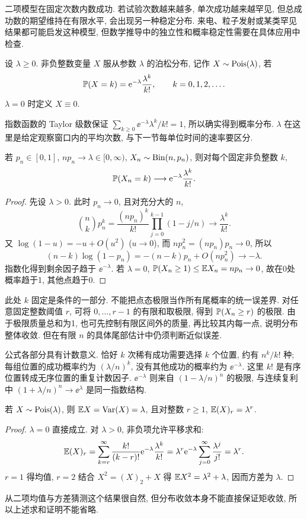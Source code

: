 
二项模型在固定次数内数成功. 若试验次数越来越多, 单次成功越来越罕见, 但总成功数的期望维持在有限水平, 会出现另一种稳定分布. 来电、粒子发射或某类罕见结果都可能启发这种模型, 但数学推导中的独立性和概率稳定性需要在具体应用中检查.
\begin{definition}
设 $\lambda\ge0$. 非负整数变量 $X$ 服从参数 $\lambda$ 的泊松分布, 记作 $X\sim\operatorname{Pois}(\lambda)$, 若
\[
\mathbb P(X=k)=\mathrm e^{-\lambda}\frac{\lambda^k}{k!},\qquad k=0,1,2,\ldots.
\]
$\lambda=0$ 时定义 $X\equiv0$.
\end{definition}
指数函数的 Taylor 级数保证 $\sum_{k\ge0}\ee^{-\lambda}\lambda^k/k!=1$, 所以确实得到概率分布. $\lambda$ 在这里是给定观察窗口内的平均次数, 与下一节每单位时间的速率要区分.

\begin{theorem}[二项分布的泊松极限]
若 $p_n\in[0,1]$, $np_n\to\lambda\in[0,\infty)$, $X_n\sim\operatorname{Bin}(n,p_n)$, 则对每个固定非负整数 $k$,
\[
\mathbb P(X_n=k)\longrightarrow\mathrm e^{-\lambda}\frac{\lambda^k}{k!}.
\]
\end{theorem}
\begin{proof}
先设 $\lambda>0$. 此时 $p_n\to0$, 且对充分大的 $n$,
\[
\binom nkp_n^k=\frac{(np_n)^k}{k!}\prod_{j=0}^{k-1}(1-j/n)\longrightarrow\frac{\lambda^k}{k!}.
\]
又 $\log(1-u)=-u+O(u^2)$ ($u\to0$), 而 $np_n^2=(np_n)p_n\to0$, 所以
\[
(n-k)\log(1-p_n)=-(n-k)p_n+O(np_n^2)\to-\lambda.
\]
指数化得到剩余因子趋于 $\ee^{-\lambda}$. 若 $\lambda=0$, $\mathbb P(X_n\ge1)\le\mathbb E X_n=np_n\to0$, 故在0处概率趋于1, 其他点趋于0.
\end{proof}
此处 $k$ 固定是条件的一部分. 不能把点态极限当作所有尾概率的统一误差界. 对任意固定整数阈值 $r$, 可将 $0,\ldots,r-1$ 的有限和取极限, 得到 $\mathbb P(X_n\ge r)$ 的极限. 由于极限质量总和为1, 也可先控制有限区间外的质量, 再比较其内每一点, 说明分布整体收敛. 但在有限 $n$ 的具体尾部估计中仍须判断近似误差.

公式各部分具有计数意义. 恰好 $k$ 次稀有成功需要选择 $k$ 个位置, 约有 $n^k/k!$ 种; 每组位置的成功概率约为 $(\lambda/n)^k$, 没有其他成功的概率约为 $\ee^{-\lambda}$. 这里 $k!$ 是有序位置转成无序位置的重复计数因子. $\ee^{-\lambda}$ 则来自 $(1-\lambda/n)^n$ 的极限, 与连续复利中 $(1+\lambda/n)^n\to\ee^\lambda$ 是同一指数结构.

\begin{proposition}
若 $X\sim\operatorname{Pois}(\lambda)$, 则 $\mathbb E X=\operatorname{Var}(X)=\lambda$, 且对整数 $r\ge1$, $\mathbb E(X)_r=\lambda^r$.
\end{proposition}
\begin{proof}
$\lambda=0$ 直接成立. 对 $\lambda>0$, 非负项允许平移求和:
\[
\mathbb E(X)_r=\sum_{k=r}^\infty\frac{k!}{(k-r)!}\mathrm e^{-\lambda}\frac{\lambda^k}{k!}
=\lambda^r\mathrm e^{-\lambda}\sum_{j=0}^\infty\frac{\lambda^j}{j!}=\lambda^r.
\]
$r=1$ 得均值, $r=2$ 结合 $X^2=(X)_2+X$ 得 $\mathbb E X^2=\lambda^2+\lambda$, 因而方差为 $\lambda$.
\end{proof}
从二项均值与方差猜测这个结果很自然, 但分布收敛本身不能直接保证矩收敛, 所以上述求和证明不能省略.

